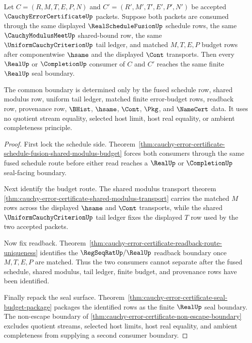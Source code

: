 \begin{theorem}
\label{thm:cauchy-error-certificate-schedule-fusion-consumer-determinacy}
Let $C=(R,M,T,E,P,N)$ and $C'=(R',M',T',E',P',N')$ be accepted $\CauchyErrorCertificateUp$ packets. Suppose both packets are consumed through the same displayed $\RealScheduleFusionUp$ schedule rows, the same $\CauchyModulusMeetUp$ shared-bound row, the same $\UniformCauchyCriterionUp$ tail ledger, and matched $M,T,E,P$ budget rows after componentwise $\hsame$ and the displayed $\Cont$ transports. Then every $\RealUp$ or $\CompletionUp$ consumer of $C$ and $C'$ reaches the same finite $\RealUp$ seal boundary.

The common boundary is determined only by the fused schedule row, shared modulus row, uniform tail ledger, matched finite error-budget rows, readback row, provenance row, $\BHist$, $\hsame$, $\Cont$, $\Pkg$, and $\NameCert$ data. It uses no quotient stream equality, selected host limit, host real equality, or ambient completeness principle.
\end{theorem}
\begin{proof}
First lock the schedule side. Theorem~\ref{thm:cauchy-error-certificate-schedule-fusion-shared-modulus-budget} forces both consumers through the same fused schedule route before either read reaches a $\RealUp$ or $\CompletionUp$ seal-facing boundary.

Next identify the budget route. The shared modulus transport theorem \autoref{thm:cauchy-error-certificate-shared-modulus-transport} carries the matched $M$ rows across the displayed $\hsame$ and $\Cont$ transports, while the shared $\UniformCauchyCriterionUp$ tail ledger fixes the displayed $T$ row used by the two accepted packets.

Now fix readback. Theorem~\ref{thm:cauchy-error-certificate-readback-route-uniqueness} identifies the $\RegSeqRatUp/\RealUp$ readback boundary once $M,T,E,P$ are matched. Thus the two consumers cannot separate after the fused schedule, shared modulus, tail ledger, finite budget, and provenance rows have been identified.

Finally repack the seal surface. Theorem~\ref{thm:cauchy-error-certificate-seal-budget-package} packages the identified rows as the finite $\RealUp$ seal boundary. The non-escape boundary of \autoref{thm:cauchy-error-certificate-non-escape-boundary} excludes quotient streams, selected host limits, host real equality, and ambient completeness from supplying a second consumer boundary.
\end{proof}

